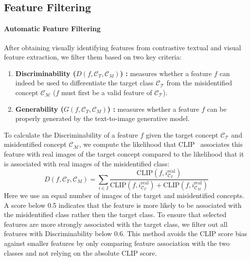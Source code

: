 \subsection{Feature Filtering}
\label{subsec:feature_filtering}


\paragraph*{Automatic Feature Filtering} 


After obtaining visually identifying features from contrastive textual and visual feature extraction, we filter them based on two key criteria:

\begin{enumerate}[topsep=0pt, itemsep=0em]
    \item \textbf{Discriminability ($D(f, \mathcal{C}_T, \mathcal{C}_M)$) :} measures whether a feature $f$ can indeed be used to differentiate the target class $\mathcal{C_\mathcal{T}}$ from the misidentified concept $\mathcal{C_\mathcal{M}}$ ($f$ must first be a valid feature of $\mathcal{C_\mathcal{T}}$).
    \item \textbf{Generability ($G(f, \mathcal{C}_T, \mathcal{C}_M)$) :} measures whether a feature $f$ can be properly generated by the text-to-image generative model.
\end{enumerate}


To calculate the Discriminability of a feature $f$ given the target concept $\mathcal{C_\mathcal{T}}$ and misidentified concept $\mathcal{C_\mathcal{M}}$, we compute the likelihood that CLIP~\cite{radford2021learning} associates this feature with real images of the target concept compared to the likelihood that it is associated with real images of the misidentified class:
\vspace{-0.5em}
\[
D(f, \mathcal{C}_T, \mathcal{C}_M) = \sum_{i \in I} \frac{\text{CLIP}(f, i_{\mathcal{C}_T}^{\text{real}})}{\text{CLIP}(f, i_{\mathcal{C}_T}^{\text{real}}) + \text{CLIP}(f, i_{\mathcal{C}_M}^{\text{real}})}
\]
Here we use an equal number of images of the target and misidentified concepts. A score below 0.5 indicates that the feature is more likely to be associated with the misidentified class rather then the target class. To ensure that selected features are more strongly associated with the target class, we filter out all features with Discriminability below 0.6. This method avoids the CLIP score bias against smaller features by only comparing feature association with the two classes and not relying on the absolute CLIP score. 

